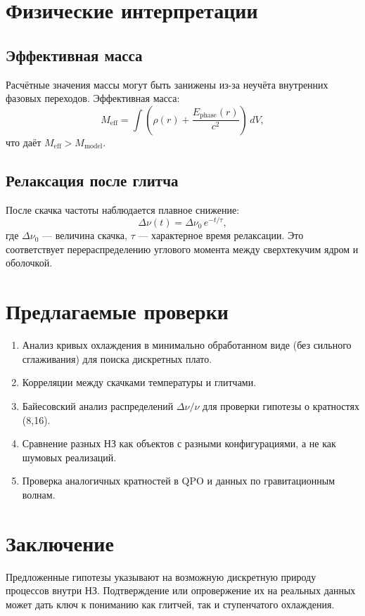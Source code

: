 \documentclass[a4paper,12pt]{article}
\begin{document}
\section{Физические интерпретации}

\subsection{Эффективная масса}
Расчётные значения массы могут быть занижены из-за неучёта внутренних фазовых переходов.
Эффективная масса:
\[
M_{\text{eff}} = \int \left( \rho(r) + \frac{E_{\text{phase}}(r)}{c^{2}} \right)\, dV,
\]
что даёт $M_{\text{eff}} > M_{\text{model}}$.

\subsection{Релаксация после глитча}
После скачка частоты наблюдается плавное снижение:
\[
\Delta \nu(t) = \Delta \nu_0 \, e^{-t/\tau},
\]
где $\Delta \nu_0$ --- величина скачка, $\tau$ --- характерное время релаксации.
Это соответствует перераспределению углового момента между сверхтекучим ядром и оболочкой.

\section{Предлагаемые проверки}
\begin{enumerate}
  \item Анализ кривых охлаждения в минимально обработанном виде (без сильного сглаживания) для поиска дискретных плато.
  \item Корреляции между скачками температуры и глитчами.
  \item Байесовский анализ распределений $\Delta\nu/\nu$ для проверки гипотезы о кратностях (8,16).
  \item Сравнение разных НЗ как объектов с разными конфигурациями, а не как шумовых реализаций.
  \item Проверка аналогичных кратностей в QPO и данных по гравитационным волнам.
\end{enumerate}

\section*{Заключение}
Предложенные гипотезы указывают на возможную дискретную природу процессов внутри НЗ.
Подтверждение или опровержение их на реальных данных может дать ключ к пониманию
как глитчей, так и ступенчатого охлаждения.
\end{document}
